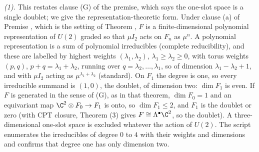 \emph{(1).} This restates clause (G) of the premise, which says the one-slot space is a single doublet; we give the representation-theoretic form. Under clause (a) of Premise , which is the setting of Theorem , $F$ is a finite-dimensional polynomial representation of $U(2)$ graded so that $\mu I_{2}$ acts on $F_{n}$ as $\mu^{n}$. A polynomial representation is a sum of polynomial irreducibles (complete reducibility), and these are labelled by highest weights $(\lambda_{1}, \lambda_{2})$, $\lambda_{1} \ge \lambda_{2} \ge 0$, with torus weights $(p, q)$, $p + q = \lambda_{1} + \lambda_{2}$, running over $q = \lambda_{2}, \dots, \lambda_{1}$, so of dimension $\lambda_{1} - \lambda_{2} + 1$, and with $\mu I_{2}$ acting as $\mu^{\lambda_{1} + \lambda_{2}}$ (standard). On $F_{1}$ the degree is one, so every irreducible summand is $(1, 0)$, the doublet, of dimension two: $\dim F_{1}$ is even. If $F$ is generated in the sense of (G), as in that theorem, $\dim F_{0} = 1$ and an equivariant map $\C^{2} \otimes F_{0} \to F_{1}$ is onto, so $\dim F_{1} \le 2$, and $F_{1}$ is the doublet or zero (with CPT closure, Theorem (3) gives $F \cong \Lambda^{\bullet}\C^{2}$, so the doublet). A three-dimensional one-slot space is excluded whatever the action of $U(2)$. The script enumerates the irreducibles of degree $0$ to $4$ with their weights and dimensions and confirms that degree one has only dimension two.

